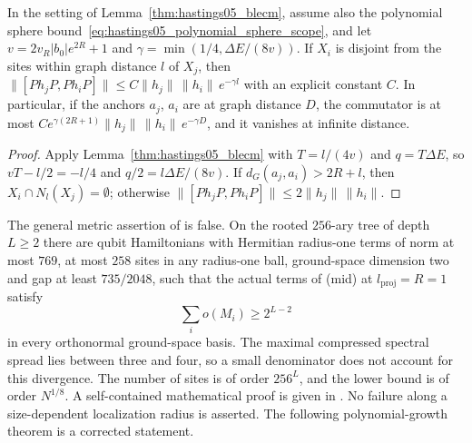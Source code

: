 \begin{lemma}
    \label{thm:hastings05_blecm_exp}
    \leanok
    In the setting of Lemma~\ref{thm:hastings05_blecm}, assume also the
    polynomial sphere bound~\eqref{eq:hastings05_polynomial_sphere_scope}, and let
    $v=2v_R|b_0|e^{2R}+1$ and $\gamma=\min(1/4,\Delta E/(8v))$. If $X_i$ is
    disjoint from the sites within graph distance $l$ of $X_j$, then
    $\|[Ph_jP,Ph_iP]\|\le C\|h_j\|\,\|h_i\|\,e^{-\gamma l}$ with an explicit
    constant $C$. In particular, if the anchors $a_j$, $a_i$ are at graph
    distance $D$, the commutator is at most
    $Ce^{\gamma(2R+1)}\|h_j\|\,\|h_i\|\,e^{-\gamma D}$, and it vanishes at
    infinite distance.
\end{lemma}
\begin{proof}\leanok
    Apply Lemma~\ref{thm:hastings05_blecm} with $T=l/(4v)$ and $q=T\Delta E$,
    so $vT-l/2=-l/4$ and $q/2=l\Delta E/(8v)$. If $d_G(a_j,a_i)>2R+l$, then
    $X_i\cap N_l(X_j)=\emptyset$; otherwise
    $\|[Ph_jP,Ph_iP]\|\le2\|h_j\|\,\|h_i\|$.
\end{proof}

\begin{remark}
    \label{rem:hastings05_unrestricted_basis_counterexample}
    The general metric assertion of
    \cite[lines 1678--1694]{Hastings2006Solving} is false. On the rooted
    $256$-ary tree of depth $L\ge2$ there are qubit Hamiltonians with
    Hermitian radius-one terms of norm at most $769$, at most $258$ sites
    in any radius-one ball, ground-space dimension two and gap at least
    $735/2048$, such that the actual terms of (mid) at
    $l_{\mathrm{proj}}=R=1$ satisfy
    \[
        \sum_i o(M_i)\ge2^{L-2}
    \]
    in every orthonormal ground-space basis. The maximal compressed
    spectral spread lies between three and four, so a small denominator
    does not account for this divergence. The number of sites is of order
    $256^L$, and the lower bound is of order $N^{1/8}$.
    A self-contained mathematical proof is given in
    \cite{gap:hastings05_tree_basis_counterexample}. No failure along a
    size-dependent localization radius is asserted. The following
    polynomial-growth theorem is a corrected statement.
\end{remark}


